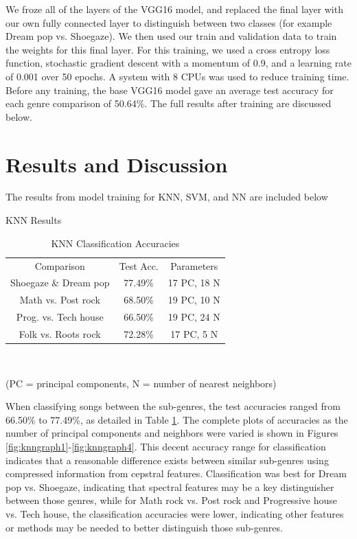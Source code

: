\documentclass[letterpaper, 12 pt, conference]{ieeeconf}  %
\begin{document}
We froze all of the layers of the VGG16 model, and replaced the final layer with our own fully connected layer to distinguish between two classes (for example Dream pop vs. Shoegaze). We then used our train and validation data to train the weights for this final layer. For this training, we used a cross entropy loss function, stochastic gradient descent with a momentum of 0.9, and a learning rate of 0.001 over 50 epochs. A system with 8 CPUs was used to reduce training time. Before any training, the base VGG16 model gave an average test accuracy for each genre comparison of 50.64\%. The full results after training are discussed below.




\section{Results and Discussion}

The results from model training for KNN, SVM, and NN are included below
\newline \,\,

\par KNN Results

\begin{table}[!hb]
    \begin{center}
    \caption{KNN Classification Accuracies}{\label{tab:knn_acc}}
    \begin{tabular}{ |c|c|c| }
      Comparison & Test Acc. & Parameters \\ 
      Shoegaze \& Dream pop & 77.49\% & 17 PC, 18 N\\
      Math vs. Post rock & 68.50\% & 19 PC, 10 N\\
      Prog. vs. Tech house & 66.50\% & 19 PC, 24 N\\
      Folk vs. Roots rock & 72.28\% & 17 PC, 5 N\\
     
    \end{tabular}\\
    \end{center}
    (PC = principal components, N = number of nearest neighbors)
\end{table}

\par When classifying songs between the sub-genres, the test accuracies ranged from 66.50\% to 77.49\%, as detailed in Table \ref{tab:knn_acc}. The complete plots of accuracies as the number of principal components and neighbors were varied is shown in Figures \ref{fig:knngraph1}-\ref{fig:knngraph4}. 
This decent accuracy range for classification indicates that a reasonable difference exists between similar sub-genres using compressed information from cepstral features. Classification was best for Dream pop vs. Shoegaze, indicating that spectral features may be a key distinguisher between those genres, while for Math rock vs. Post rock and Progressive house vs. Tech house, the classification accuracies were lower, indicating other features or methods may be needed to better distinguish those sub-genres. \newline
\end{document}
